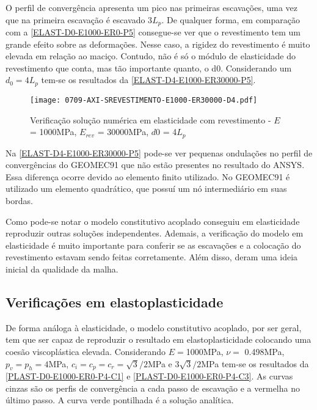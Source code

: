 O perfil de convergência apresenta um pico nas primeiras escavações, uma vez que na primeira escavação é escavado 3$L_p$. De qualquer forma, em comparação com a \autoref{ELAST-D0-E1000-ER0-P5} consegue-se ver que o revestimento tem um grande efeito sobre as deformações. Nesse caso, a rigidez do revestimento é muito elevada em relação ao maciço. Contudo, não é só o módulo de elasticidade do revestimento que conta, mas tão importante quanto, o d0. Considerando um $d_0=4L_p$ tem-se os resultados da \autoref{ELAST-D4-E1000-ER30000-P5}.

\begin{figure}[H]
	\begin{center}
		\texttt{[image: 0709-AXI-SREVESTIMENTO-E1000-ER30000-D4.pdf]}
	\end{center}
	\caption{\label{ELAST-D4-E1000-ER30000-P5}Verificação solução numérica em elasticidade com revestimento - $E$ = 1000MPa, $E_{rev}$ = 30000MPa, $d0$ = 4$L_p$}
\end{figure}

Na \autoref{ELAST-D4-E1000-ER30000-P5} pode-se ver pequenas ondulações no perfil de convergências do GEOMEC91 que não estão presentes no resultado do ANSYS. Essa diferença ocorre devido ao elemento finito utilizado. No GEOMEC91 é utilizado um elemento quadrático, que possuí um nó intermediário em suas bordas.

Como pode-se notar o modelo constitutivo acoplado conseguiu em elasticidade reproduzir outras soluções independentes. Ademais, a verificação do modelo em elasticidade é muito importante para conferir se as escavações e a colocação do revestimento estavam sendo feitas corretamente. Além disso, deram uma ideia inicial da qualidade da malha.

\subsection{Verificações em elastoplasticidade}

De forma análoga à elasticidade, o modelo constitutivo acoplado, por ser geral, tem que ser capaz de reproduzir o resultado em elastoplasticidade colocando uma coesão viscoplástica elevada. Considerando $E =$1000MPa, $\nu =$ 0.498MPa, $p_v = p_h = 4$MPa, $c_i=c_p=c_r = \sqrt{3}/2$MPa e $3\sqrt{3}/2$MPa  tem-se os resultados da \autoref{PLAST-D0-E1000-ER0-P4-C1} e \autoref{PLAST-D0-E1000-ER0-P4-C3}. As curvas cinzas são os perfis de convergência a cada passo de escavação e a vermelha no último passo. A curva verde pontilhada é a solução analítica.

